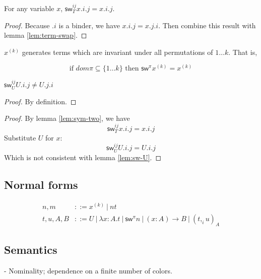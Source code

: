 \documentclass[10pt,a4paper]{article}
\newcommand\CC[4]{(#2,_{#1} #3)_{#4}}
\newcommand\sw[2]{\mathsf{sw}^{#1}_{#2}}
\newcommand\pvar[2]{{#1}^{(#2)}}
\begin{document}
\begin{lemma}\label{lem:sym-two}
  For any variable $x$, $\sw {ij} T x.i.j = x.i.j$.
\end{lemma}
\begin{proof}
  Because $.i$ is a binder, we have $x.i.j = x.j.i$. Then combine this
  result with lemma \ref{lem:term-swap}.
\end{proof}
\begin{corollary}
  $\pvar x k$ generates terms which are invariant under all permutations
  of $1…k$. That is, 

   $$   \text{if~} dom π ⊆ \{1…k\} \text{~then~} \sw {π} {} \pvar x k = \pvar x k$$
\end{corollary}

\begin{lemma} \label{lem:sw-U}
  $\sw {ij} U U.i.j ‌≠ U.j.i$
\end{lemma}
\begin{proof}
By definition.
\end{proof}

\begin{theorem}[inconsistency]
  
\end{theorem}
\begin{proof}
  By lemma \ref{lem:sym-two}, we have
  $$\sw {ij} T x.i.j = x.i.j$$
  Substitute $U$ for $x$:
  $$\sw {ij} U U.i.j = U.i.j$$
  Which is not consistent with lemma \ref{lem:sw-U}.
\end{proof}

\subsection{Normal forms}

\begin{align*}
  n,m & ::= \pvar x k ~|~ n t \\
  t,u,A,B & ::= U ~|~ λx:A. t      ~|~ \sw {π} {} n ~|~  (x:A) → B 
             ~|~ \CC i t u A
\end{align*}


\subsection{Semantics}

- Nominality; dependence on a finite number of colors.
\end{document}
